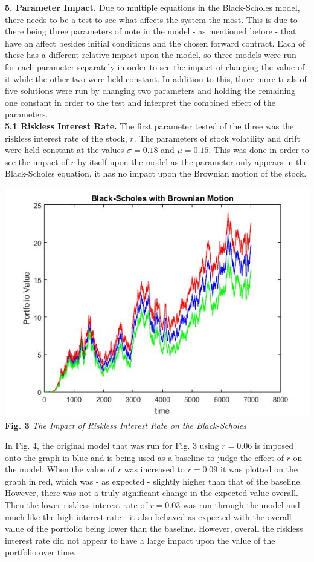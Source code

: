 \documentclass{report}
\begin{document}
	\textbf{5. Parameter Impact.} Due to multiple equations in the Black-Scholes model, there needs to be a test to see what affects the system the most. This is due to there being three parameters of note in the model - as mentioned before - that have an affect besides initial conditions and the chosen forward contract. Each of these has a different relative impact upon the model, so three models were run for each parameter separately in order to see the impact of changing the value of it while the other two were held constant. In addition to this, three more trials of five solutions were run by changing two parameters and holding the remaining one constant in order to the test and interpret the combined effect of the parameters.
	\\
	
	\textbf{5.1 Riskless Interest Rate.} The first parameter tested of the three was the riskless interest rate of the stock, $r$. The parameters of stock volatility and drift were held constant at the values $\sigma = 0.18$ and $\mu = 0.15$. This was done in order to see the impact of $r$ by itself upon the model as the parameter only appears in the Black-Scholes equation, it has no impact upon the Brownian motion of the stock.
	
	\begin{center}
		\includegraphics[scale=0.4]{interestimpact}
		\\ \textbf{Fig. 3} \textit{The Impact of Riskless Interest Rate on the Black-Scholes}
	\end{center}
	
	In Fig. 4, the original model that was run for Fig. 3 using $r = 0.06$ is imposed onto the graph in blue and is being used as a baseline to judge the effect of $r$ on the model. When the value of $r$ was increased to $r=0.09$ it was plotted on the graph in red, which was - as expected - slightly higher than that of the baseline. However, there was not a truly significant change in the expected value overall. Then the lower riskless interest rate of $r=0.03$ was run through the model and - much like the high interest rate - it also behaved as expected with the overall value of the portfolio being lower than the baseline. However, overall the riskless interest rate did not appear to have a large impact upon the value of the portfolio over time.
	\\
	
\end{document}
